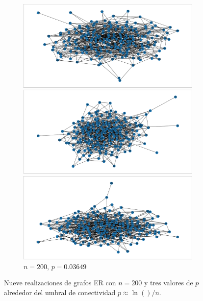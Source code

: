 \documentclass{article}
\begin{document}
\begin{figure}[htb]
    \par\bigskip

    \begin{subfigure}{\textwidth}
        \centering
        \begin{minipage}{0.32\textwidth}
            \centering
            \includegraphics[width=\linewidth]{images/erdos_renyi/n200_p0.03649158683274018_0.pdf}
        \end{minipage}\hfill
        \begin{minipage}{0.32\textwidth}
            \centering
            \includegraphics[width=\linewidth]{images/erdos_renyi/n200_p0.03649158683274018_1.pdf}
        \end{minipage}\hfill
        \begin{minipage}{0.32\textwidth}
            \centering
            \includegraphics[width=\linewidth]{images/erdos_renyi/n200_p0.03649158683274018_2.pdf}
        \end{minipage}
        \caption{$n=200$, $p=0.03649$}
    \end{subfigure}

    \caption{Nueve realizaciones de grafos ER con $n=200$ y tres valores de $p$ alrededor del umbral de conectividad $p \approx \ln()/n$. }
    \label{fig:er_threshold}
\end{figure}
\end{document}
